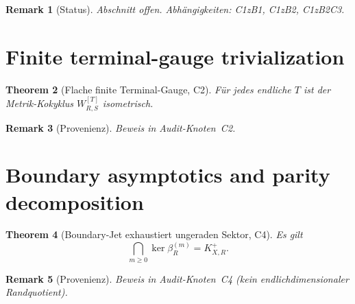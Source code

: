 \documentclass[12pt,a4paper]{amsart}
\newtheorem{theorem}{Theorem}[section]
\newtheorem{remark}[theorem]{Remark}
\newcommand{\KXRp}{K_{X,R}^{+}}
\newcommand{\betaR}{\beta_R}
\begin{document}

\begin{remark}[Status]
  Abschnitt offen. Abhängigkeiten: C1zB1, C1zB2, C1zB2C3.
\end{remark}

\section{Finite terminal-gauge trivialization}
\label{sec:terminal-gauge-finite}


\begin{theorem}[Flache finite Terminal-Gauge, C2]
  \label{thm:flat-gauge}
  Für jedes endliche $T$ ist der Metrik-Kokyklus
  $W_{R,S}^{[T]}$ isometrisch.
\end{theorem}

\begin{remark}[Provenienz]
  Beweis in Audit-Knoten~C2.
\end{remark}

\section{Boundary asymptotics and parity decomposition}
\label{sec:parity}


\begin{theorem}[Boundary-Jet exhaustiert ungeraden Sektor, C4]
  \label{thm:boundary-jet}
  Es gilt
  \[
    \bigcap_{m \geq 0} \ker \betaR^{(m)} = \KXRp.
  \]
\end{theorem}

\begin{remark}[Provenienz]
  Beweis in Audit-Knoten~C4 (kein endlichdimensionaler Randquotient).
\end{remark}
\end{document}
